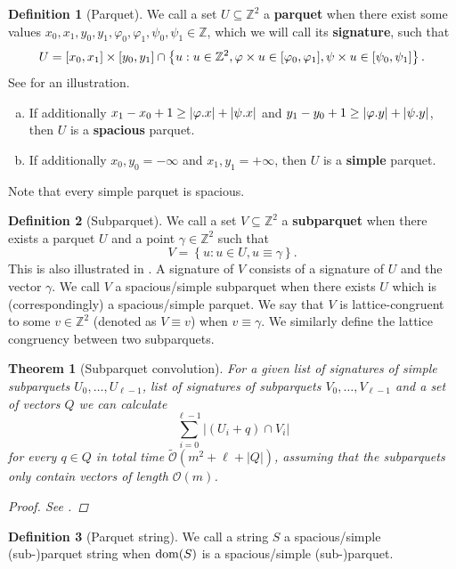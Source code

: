 \documentclass[11pt]{article}
\newcommand{\Z}{\mathbb{Z}}
\renewcommand{\O}{\mathcal{O}}
\newcommand{\tO}{\tilde{\mathcal{O}}}
\renewcommand{\phi}{\varphi}
\newcommand{\set}[1]{\left\lbrace #1 \right\rbrace}
\theoremstyle{plain}
\newtheorem{theorem}{Theorem}
\theoremstyle{definition}
\newtheorem{definition}{Definition}
\theoremstyle{remark}
\begin{document}
\begin{definition}[Parquet]\label{parquet_definition}
	We call a set $U \subseteq \Z^2$ a \textbf{parquet} when there exist some values $x_0, x_1, y_0, y_1, \phi_0, \phi_1, \psi_0, \psi_1 \in \Z$, which we will call its \textbf{signature}, such that
	\[ U = [x_0, x_1] \times [y_0, y_1] \cap \set{u : u \in \Z^2, \h{u} \in [\phi_0, \phi_1], \s{u} \in [\psi_0, \psi_1]}. \]
	See  for an illustration.
	\begin{enumerate}[a)]
		\item If additionally $x_1 - x_0 + 1 \ge |\x{\phi}| + |\x{\psi}|$ and $y_1 - y_0 + 1 \ge |\y{\phi}| + |\y{\psi}|$, then $U$ is a \textbf{spacious} parquet.
		\item If additionally $x_0, y_0 = -\infty$ and $x_1, y_1 = +\infty$, then $U$ is a \textbf{simple} parquet.
	\end{enumerate}
	Note that every simple parquet is spacious.
\end{definition}


\begin{definition}[Subparquet]\label{subparquet_definition}
	We call a set $V \subseteq \Z^2$ a \textbf{subparquet} when there exists a parquet $U$ and a point $\gamma \in \Z^2$ such that
	\[ V = \set{u : u \in U, u \equiv \gamma}.\]
	This is also illustrated in .
	A signature of $V$ consists of a signature of $U$ and the vector $\gamma$.
	We call $V$ a spacious/simple subparquet when there exists $U$ which is (correspondingly) a spacious/simple parquet.
	We say that $V$ is lattice-congruent to some $v \in \Z^2$ (denoted as $V \equiv v$) when $v \equiv \gamma$.
	We similarly define the lattice congruency between two subparquets.
\end{definition}


\begin{theorem}[Subparquet convolution]\label{subparquet_convolution}
	For a given list of signatures of simple subparquets $U_0, \dots, U_{\ell - 1}$, list of signatures of subparquets $V_0, \dots, V_{\ell - 1}$ and a set of vectors $Q$ we can calculate
	\[ \sum_{i = 0}^{\ell - 1} |(U_i + q) \cap V_i| \]
	for every $q \in Q$ in total time $\tO(m^2 + \ell + |Q|)$, assuming that the subparquets only contain vectors of length $\O(m)$.
	\begin{proof} See . \end{proof}
\end{theorem}


\begin{definition}[Parquet string]
	We call a string $S$ a spacious/simple (sub-)parquet string when $\operatorname*{dom}(S)$ is a spacious/simple (sub-)parquet.
\end{definition}
\end{document}

